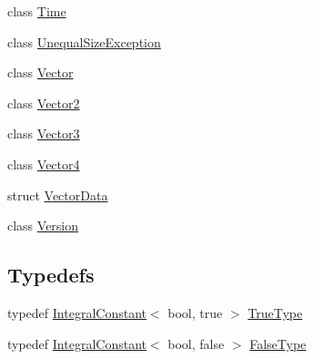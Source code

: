 \begin{DoxyCompactItemize}
class \hyperlink{classprism_1_1_time}{Time}
\item 
class \hyperlink{classprism_1_1_unequal_size_exception}{Unequal\+Size\+Exception}
\item 
class \hyperlink{classprism_1_1_vector}{Vector}
\item 
class \hyperlink{classprism_1_1_vector2}{Vector2}
\item 
class \hyperlink{classprism_1_1_vector3}{Vector3}
\item 
class \hyperlink{classprism_1_1_vector4}{Vector4}
\item 
struct \hyperlink{structprism_1_1_vector_data}{Vector\+Data}
\item 
class \hyperlink{classprism_1_1_version}{Version}
\end{DoxyCompactItemize}
\subsection*{Typedefs}
\begin{DoxyCompactItemize}
\item 
typedef \hyperlink{structprism_1_1_integral_constant}{Integral\+Constant}$<$ bool, true $>$ \hyperlink{namespaceprism_a7d28160dd23799e4294e2d705294f16f}{True\+Type}
\item 
typedef \hyperlink{structprism_1_1_integral_constant}{Integral\+Constant}$<$ bool, false $>$ \hyperlink{namespaceprism_ab11baa40bd94b92172c01957db05a76f}{False\+Type}
\end{DoxyCompactItemize}
